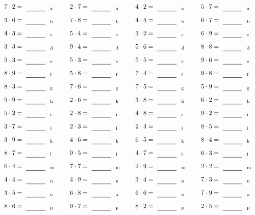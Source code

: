 \documentclass
[
  draft    = true,
  fontsize = 11pt,
  parskip  = half-
]
{scrartcl}
\begin{document}
\par\vfill\par
\begin{align*}
    \pline{7\cdot2}&=\rline{a}
  & \pline{2\cdot7}&=\rline{a}
  & \pline{4\cdot2}&=\rline{a}
  & \pline{5\cdot7}&=\rline{a} \\[1ex]
    \pline{3\cdot6}&=\rline{b}
  & \pline{7\cdot8}&=\rline{b}
  & \pline{4\cdot5}&=\rline{b}
  & \pline{6\cdot7}&=\rline{b} \\[1ex]
    \pline{4\cdot3}&=\rline{c}
  & \pline{5\cdot4}&=\rline{c}
  & \pline{3\cdot2}&=\rline{c}
  & \pline{6\cdot9}&=\rline{c} \\[1ex]
    \pline{3\cdot3}&=\rline{d}
  & \pline{9\cdot4}&=\rline{d}
  & \pline{5\cdot6}&=\rline{d}
  & \pline{8\cdot8}&=\rline{d} \\[1ex]
    \pline{9\cdot3}&=\rline{e}
  & \pline{5\cdot3}&=\rline{e}
  & \pline{5\cdot5}&=\rline{e}
  & \pline{9\cdot6}&=\rline{e} \\[1ex]
    \pline{8\cdot9}&=\rline{f}
  & \pline{5\cdot8}&=\rline{f}
  & \pline{7\cdot4}&=\rline{f}
  & \pline{9\cdot8}&=\rline{f} \\[1ex]
    \pline{8\cdot3}&=\rline{g}
  & \pline{7\cdot6}&=\rline{g}
  & \pline{7\cdot5}&=\rline{g}
  & \pline{5\cdot9}&=\rline{g} \\[1ex]
    \pline{9\cdot9}&=\rline{h}
  & \pline{2\cdot6}&=\rline{h}
  & \pline{3\cdot8}&=\rline{h}
  & \pline{6\cdot2}&=\rline{h} \\[1ex]
    \pline{5\cdot2}&=\rline{i}
  & \pline{2\cdot8}&=\rline{i}
  & \pline{4\cdot8}&=\rline{i}
  & \pline{9\cdot2}&=\rline{i} \\[1ex]
    \pline{3\cdot7}&=\rline{j}
  & \pline{2\cdot3}&=\rline{j}
  & \pline{2\cdot4}&=\rline{j}
  & \pline{8\cdot5}&=\rline{j} \\[1ex]
    \pline{3\cdot9}&=\rline{k}
  & \pline{4\cdot6}&=\rline{k}
  & \pline{6\cdot5}&=\rline{k}
  & \pline{8\cdot4}&=\rline{k} \\[1ex]
    \pline{8\cdot7}&=\rline{l}
  & \pline{9\cdot5}&=\rline{l}
  & \pline{4\cdot7}&=\rline{l}
  & \pline{6\cdot3}&=\rline{l} \\[1ex]
    \pline{6\cdot4}&=\rline{m}
  & \pline{7\cdot7}&=\rline{m}
  & \pline{2\cdot9}&=\rline{m}
  & \pline{2\cdot2}&=\rline{m} \\[1ex]
    \pline{4\cdot4}&=\rline{n}
  & \pline{4\cdot9}&=\rline{n}
  & \pline{3\cdot4}&=\rline{n}
  & \pline{7\cdot3}&=\rline{n} \\[1ex]
    \pline{3\cdot5}&=\rline{o}
  & \pline{6\cdot8}&=\rline{o}
  & \pline{6\cdot6}&=\rline{o}
  & \pline{7\cdot9}&=\rline{o} \\[1ex]
    \pline{8\cdot6}&=\rline{p}
  & \pline{9\cdot7}&=\rline{p}
  & \pline{8\cdot2}&=\rline{p}
  & \pline{2\cdot5}&=\rline{p}
\end{align*}
\end{document}
